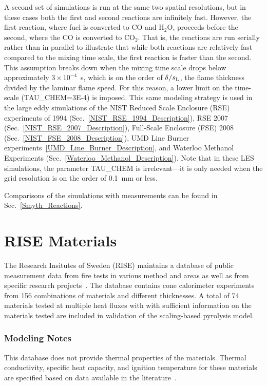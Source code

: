 A second set of simulations is run at the same two spatial resolutions, but in these cases both the first and second reactions are infinitely fast. However, the first reaction, where fuel is converted to CO and H$_2$O, proceeds before the second, where the CO is converted to CO$_2$. That is, the reactions are run serially rather than in parallel to illustrate that while both reactions are relatively fast compared to the mixing time scale, the first reaction is faster than the second. This assumption breaks down when the mixing time scale drops below approximately $3 \times 10^{-4}$~s, which is on the order of $\delta/s_{\rm L}$, the flame thickness divided by the laminar flame speed. For this reason, a lower limit on the time-scale ({\ct TAU\_CHEM=3E-4}) is imposed. This same modeling strategy is used in the large eddy simulations of the NIST Reduced Scale Enclosure (RSE) experiments of 1994 (Sec.~\ref{NIST_RSE_1994_Description}), RSE 2007 (Sec.~\ref{NIST_RSE_2007_Description}), Full-Scale Enclosure (FSE) 2008 (Sec.~\ref{NIST_FSE_2008_Description}), UMD Line Burner experiments~\ref{UMD_Line_Burner_Description}, and Waterloo Methanol Experiments (Sec.~\ref{Waterloo_Methanol_Description}). Note that in these LES simulations, the parameter {\ct TAU\_CHEM} is irrelevant---it is only needed when the grid resolution is on the order of 0.1~mm or less.

Comparisons of the simulations with measurements can be found in Sec.~\ref{Smyth_Reactions}.


\section{RISE Materials}
\label{RISE_Materials_Description}

The Research Insitutes of Sweden (RISE) maintains a database of public measurement data from fire tests in various method and areas as well as from specific research projects~\cite{RISE:Fire_Database}.
The database contains cone calorimeter experiments from 156 combinations of materials and different thicknesses.
A total of 74 materials tested at multiple heat fluxes with with sufficient information on the materials tested are included in validation of the scaling-based pyrolysis model.

\subsubsection{Modeling Notes}

This database does not provide thermal properties of the materials. Thermal conductivity, specific heat capacity, and ignition temperature for these materials are specified based on data available in the literature~\cite{SFPE:Tewarson}.




